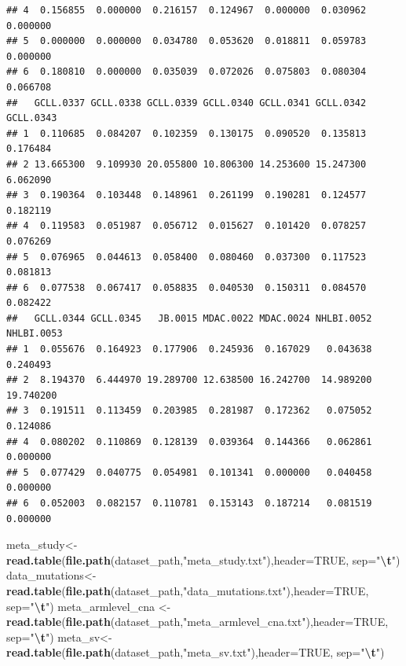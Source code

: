 \documentclass[
]{article}
\newenvironment{Shaded}{\begin{snugshade}}{\end{snugshade}}
\newcommand{\AttributeTok}[1]{\textcolor[rgb]{0.13,0.29,0.53}{#1}}
\newcommand{\ConstantTok}[1]{\textcolor[rgb]{0.56,0.35,0.01}{#1}}
\newcommand{\FunctionTok}[1]{\textcolor[rgb]{0.13,0.29,0.53}{\textbf{#1}}}
\newcommand{\NormalTok}[1]{#1}
\newcommand{\OtherTok}[1]{\textcolor[rgb]{0.56,0.35,0.01}{#1}}
\newcommand{\SpecialCharTok}[1]{\textcolor[rgb]{0.81,0.36,0.00}{\textbf{#1}}}
\newcommand{\StringTok}[1]{\textcolor[rgb]{0.31,0.60,0.02}{#1}}
\begin{document}
\begin{verbatim}
## 4  0.156855  0.000000  0.216157  0.124967  0.000000  0.030962  0.000000
## 5  0.000000  0.000000  0.034780  0.053620  0.018811  0.059783  0.000000
## 6  0.180810  0.000000  0.035039  0.072026  0.075803  0.080304  0.066708
##   GCLL.0337 GCLL.0338 GCLL.0339 GCLL.0340 GCLL.0341 GCLL.0342 GCLL.0343
## 1  0.110685  0.084207  0.102359  0.130175  0.090520  0.135813  0.176484
## 2 13.665300  9.109930 20.055800 10.806300 14.253600 15.247300  6.062090
## 3  0.190364  0.103448  0.148961  0.261199  0.190281  0.124577  0.182119
## 4  0.119583  0.051987  0.056712  0.015627  0.101420  0.078257  0.076269
## 5  0.076965  0.044613  0.058400  0.080460  0.037300  0.117523  0.081813
## 6  0.077538  0.067417  0.058835  0.040530  0.150311  0.084570  0.082422
##   GCLL.0344 GCLL.0345   JB.0015 MDAC.0022 MDAC.0024 NHLBI.0052 NHLBI.0053
## 1  0.055676  0.164923  0.177906  0.245936  0.167029   0.043638   0.240493
## 2  8.194370  6.444970 19.289700 12.638500 16.242700  14.989200  19.740200
## 3  0.191511  0.113459  0.203985  0.281987  0.172362   0.075052   0.124086
## 4  0.080202  0.110869  0.128139  0.039364  0.144366   0.062861   0.000000
## 5  0.077429  0.040775  0.054981  0.101341  0.000000   0.040458   0.000000
## 6  0.052003  0.082157  0.110781  0.153143  0.187214   0.081519   0.000000
\end{verbatim}

\begin{Shaded}
\begin{Highlighting}[]
\NormalTok{meta\_study}\OtherTok{\textless{}{-}} \FunctionTok{read.table}\NormalTok{(}\FunctionTok{file.path}\NormalTok{(dataset\_path,}\StringTok{"meta\_study.txt"}\NormalTok{),}\AttributeTok{header=}\ConstantTok{TRUE}\NormalTok{, }\AttributeTok{sep=}\StringTok{"}\SpecialCharTok{\textbackslash{}t}\StringTok{"}\NormalTok{)}
\NormalTok{data\_mutations}\OtherTok{\textless{}{-}} \FunctionTok{read.table}\NormalTok{(}\FunctionTok{file.path}\NormalTok{(dataset\_path,}\StringTok{"data\_mutations.txt"}\NormalTok{),}\AttributeTok{header=}\ConstantTok{TRUE}\NormalTok{, }\AttributeTok{sep=}\StringTok{"}\SpecialCharTok{\textbackslash{}t}\StringTok{"}\NormalTok{)}
\NormalTok{meta\_armlevel\_cna  }\OtherTok{\textless{}{-}} \FunctionTok{read.table}\NormalTok{(}\FunctionTok{file.path}\NormalTok{(dataset\_path,}\StringTok{"meta\_armlevel\_cna.txt"}\NormalTok{),}\AttributeTok{header=}\ConstantTok{TRUE}\NormalTok{, }\AttributeTok{sep=}\StringTok{"}\SpecialCharTok{\textbackslash{}t}\StringTok{"}\NormalTok{)                       }
\NormalTok{meta\_sv}\OtherTok{\textless{}{-}} \FunctionTok{read.table}\NormalTok{(}\FunctionTok{file.path}\NormalTok{(dataset\_path,}\StringTok{"meta\_sv.txt"}\NormalTok{),}\AttributeTok{header=}\ConstantTok{TRUE}\NormalTok{, }\AttributeTok{sep=}\StringTok{"}\SpecialCharTok{\textbackslash{}t}\StringTok{"}\NormalTok{)}
\end{Highlighting}
\end{Shaded}
\end{document}

